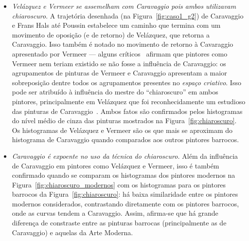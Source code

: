 \begin{itemize}
  \item \textit{Velázquez e Vermeer se assemelham com Caravaggio pois
    ambos utilizavam \textit{chiaroscuro}}. A trajetória desenhada (na
    Figura~\ref{fig:caso1_g2}) de Caravaggio e Frans Hals até Poussin
    estabelece um caminho que termina com um movimento de oposição (e
    de retorno) de Vel\'{a}zquez, que retorna a Caravaggio.  Isso
    também é notado no movimento de retorno à Cavaraggio apresentado
    por Vermeer --- alguns críticos~\cite{lambert} afirmam que
    pintores como Vermeer nem teriam existido se não fosse a
    influência de Caravaggio: os agrupamentos de pinturas de Vermeer e
    Caravaggio apresentam a maior sobreposição dentre todos os
    agrupamentos presentes no \textit{espaço criativo}. Isso pode ser
    atribuído à influência do mestre do ``chiaroscuro'' em ambos
    pintores, principalmente em Vel\'{a}zquez que foi reconhecidamente
    um estudioso das pinturas de Caravaggio~\cite{gombrich}. Ambos
    fatos são confirmados pelos histogramas do nível médio de cinza
    das pinturas mostrados na Figura~\ref{fig:chiaroscuro}. Os
    histogramas de Velázquez e Vermeer são os que mais se aproximam do
    histograma de Caravaggio quando comparados aos outros pintores
    barrocos.

    \item \textit{Caravaggio é expoente no uso da técnica
      do \textit{chiaroscuro}.} Além da influência de Caravaggio em
      pintores como Velázquez e Vermeer, isso é também confirmado
      quando se comparam os histogramas dos pintores modernos na
      Figura~\ref{fig:chiaroscuro_modernos} com os histogramas para os
      pintores barrocos da Figura~\ref{fig:chiaroscuro}: há baixa
      similaridade entre os pintores modernos considerados,
      contrastando diretamente com os pintores barrocos, onde as
      curvas tendem a Caravaggio. Assim, afirma-se que há grande
      diferença de constraste entre as pinturas barrocas
      (principalmente as de Caravaggio) e aquelas da Arte Moderna.
\end{itemize}

